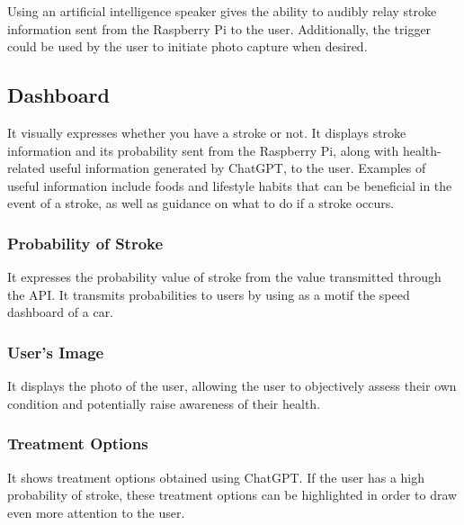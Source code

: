 Using an artificial intelligence speaker gives the ability to audibly relay stroke information sent from the Raspberry Pi to the user. Additionally, the trigger could be used by the user to initiate photo capture when desired.\\

\subsection{\textbf{Dashboard}}
It visually expresses whether you have a stroke or not. It displays stroke information and its probability sent from the Raspberry Pi, along with health-related useful information generated by ChatGPT, to the user. Examples of useful information include foods and lifestyle habits that can be beneficial in the event of a stroke, as well as guidance on what to do if a stroke occurs.\\
\subsubsection{\textbf{Probability of Stroke}}
It expresses the probability value of stroke from the value transmitted through the API. It transmits probabilities to users by using as a motif the speed dashboard of a car.\\
\subsubsection{\textbf{User's Image}}
It displays the photo of the user, allowing the user to objectively assess their own condition and potentially raise awareness of their health.\\
\subsubsection{\textbf{Treatment Options}}
It shows treatment options obtained using ChatGPT. If the user has a high probability of stroke, these treatment options can be highlighted in order to draw even more attention to the user.\\
